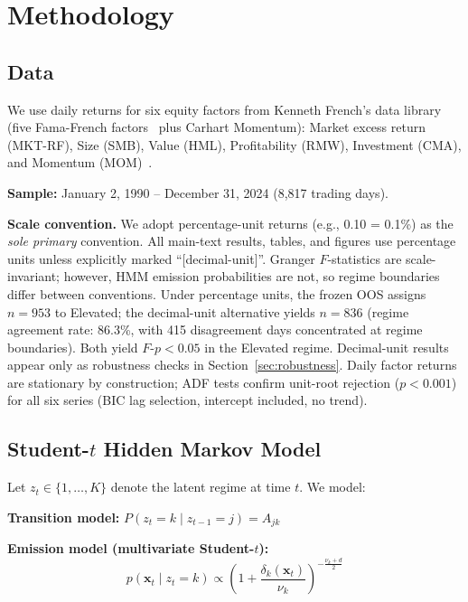 \documentclass[sigconf,anonymous]{acmart}
\begin{document}
\section{Methodology}

\subsection{Data}

We use daily returns for six equity factors from Kenneth French's data library~\cite{french2024data} (five Fama-French factors~\cite{fama2015five} plus Carhart Momentum):
Market excess return (MKT-RF), Size (SMB), Value (HML), Profitability (RMW),
Investment (CMA), and Momentum (MOM)~\cite{jegadeesh1993returns,carhart1997persistence}.

\textbf{Sample:} January 2, 1990 -- December 31, 2024 (8,817 trading days).

\textbf{Scale convention.} We adopt percentage-unit returns (e.g., 0.10 = 0.1\%) as the
\emph{sole primary} convention. All main-text results, tables, and figures use
percentage units unless explicitly marked ``[decimal-unit]''.
Granger $F$-statistics are scale-invariant; however, HMM emission probabilities are not,
so regime boundaries differ between conventions. Under percentage units,
the frozen OOS assigns $n = 953$ to Elevated; the decimal-unit alternative yields $n = 836$
(regime agreement rate: 86.3\%, with 415 disagreement days concentrated at regime boundaries).
Both yield $F$-$p < 0.05$ in the Elevated regime.
Decimal-unit results appear only as robustness checks in Section~\ref{sec:robustness}.
Daily factor returns are stationary by construction; ADF tests confirm unit-root
rejection ($p < 0.001$) for all six series (BIC lag selection, intercept included,
no trend).

\subsection{Student-\texorpdfstring{$t$}{t} Hidden Markov Model}
\label{sec:hmm}

Let $z_t \in \{1, \ldots, K\}$ denote the latent regime at time $t$. We model:

\textbf{Transition model:}
$P(z_t = k \mid z_{t-1} = j) = A_{jk}$

\textbf{Emission model (multivariate Student-$t$):}
\begin{equation}
p(\mathbf{x}_t \mid z_t = k) \propto \left(1 + \frac{\delta_k(\mathbf{x}_t)}{\nu_k}\right)^{-\frac{\nu_k+d}{2}}
\end{equation}
\end{document}
